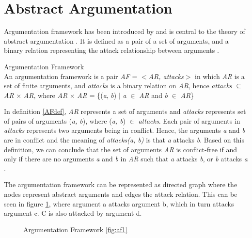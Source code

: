 \section{Abstract Argumentation}
Argumentation framework has been introduced by \citet{dung1995} and is central to the theory of abstract argumentation \citep{baroni2011introduction}. It is defined as a pair of a set of arguments, and a binary relation representing the attack relationship between arguments \citep{dung1995}. 

\theoremstyle{definition}
\begin{definition}{Argumentation Framework}
\label{AFdef}\\
An argumentation framework is a pair \textit{AF} = $<$\textit{AR, attacks}$>$ in which \textit{AR} is a set of finite arguments, and \textit{attacks} is a binary relation on \textit{AR}, hence \textit{attacks} $\subseteq$ \textit{AR} $\times$ \textit{AR}, where \textit{AR} $\times$ \textit{AR} = \{(\textit{a}, \textit{b}) $\vert$ \textit{a} $\in$ \textit{AR} and \textit{b} $\in$ \textit{AR}\}
\end{definition}

In definition \ref{AFdef}, \textit{AR} represents a set of arguments and \textit{attacks} represents set of pairs of arguments (\textit{a, b}), where (\textit{a, b}) $\in$ \textit{attacks}. Each pair of arguments in \textit{attacks} represents two arguments being in conflict. Hence, the arguments \textit{a} and \textit{b} are in conflict and the meaning of \textit{attacks(a, b)} is that \textit{a} attacks \textit{b}. Based on this definition, we can conclude that the set of arguments \textit{AR} is conflict-free if and only if there are no arguments \textit{a} and \textit{b} in \textit{AR} such that \textit{a} attacks \textit{b}, or \textit{b} attacks \textit{a} \citep{dung1995}.

The argumentation framework can be represented as directed graph where the nodes represent abstract arguments and edges the attack relation. This can be seen in figure \ref{fig:argumentationFrameworkFigure}, where argument a attacks argument b, which in turn attacks argument c. C is also attacked by argument d.
\newpage
\begin{figure}[h]
\centering
{}
\caption{Argumentation Framework \ref{fig:af1}}
\label{fig:argumentationFrameworkFigure}
\end{figure}
 
